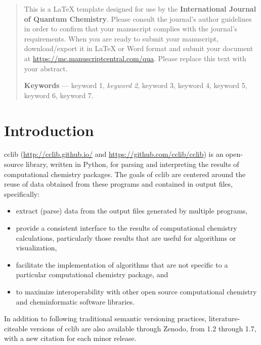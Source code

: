 \documentclass[num-refs]{wiley-article}
\begin{document}
\maketitle
{}
\listoffixmes{}
\begin{abstract}
This is a LaTeX template designed for use by the \textbf{International Journal of Quantum Chemistry}. Please consult the journal's author guidelines in order to confirm that your manuscript complies with the journal's requirements. When you are ready to submit your manuscript, download/export it in LaTeX or Word format and submit your document at \href{https://mc.manuscriptcentral.com/qua}{https://mc.manuscriptcentral.com/qua}. Please replace this text with your abstract.

\textbf{Keywords} --- keyword 1, \emph{keyword 2}, keyword 3, keyword 4, keyword 5, keyword 6, keyword 7.
\end{abstract}

\section{Introduction}

cclib\cite{Oboyle2008} (\url{http://cclib.github.io/} and \url{https://github.com/cclib/cclib}) is an open-source library, written in Python, for parsing and interpreting the results of computational chemistry packages.  The goals of cclib are centered around the reuse of data obtained from these programs and contained in output files, specifically:
\begin{itemize}
\item extract (parse) data from the output files generated by multiple programs,
\item provide a consistent interface to the results of computational chemistry calculations, particularly those results that are useful for algorithms or visualization,
\item facilitate the implementation of algorithms that are not specific to a particular computational chemistry package, and
\item to maximize interoperability with other open source computational chemistry and cheminformatic software libraries.
\end{itemize}

In addition to following traditional semantic versioning practices, literature-citeable versions of cclib are also available through Zenodo, from 1.2\cite{Langner2014} through 1.7\cite{Berquist2021}, with a new citation for each minor release.
\end{document}
